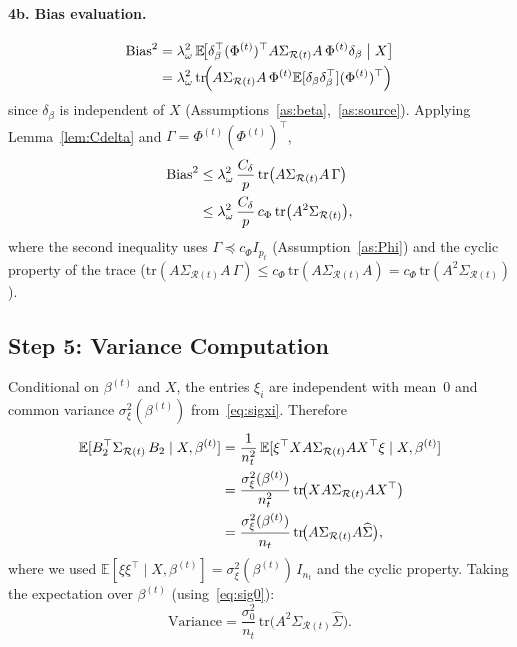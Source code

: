 \documentclass[11pt]{article}
\theoremstyle{definition}
\newcommand{\Rt}{\mathcal{R}(t)}
\newcommand{\SigR}{\Sigma_{\Rt}}
\newcommand{\hSig}{\widehat{\Sigma}}
\newcommand{\E}{\mathbb{E}}
\newcommand{\tr}{\mathrm{tr}}
\begin{document}
\paragraph{4b.  Bias evaluation.}
 
\begin{align}
  \text{Bias}^2
  &=\lambda_\omega^2\,
    \E\!\bigl[\delta_\beta^\top(\Phi^{(t)})^\top
    A\SigR A\,\Phi^{(t)}\delta_\beta
    \;\big|\;X\bigr]
  \notag\\
  &=\lambda_\omega^2\,
    \tr\!\Bigl(A\SigR A\,
    \Phi^{(t)}\E[\delta_\beta\delta_\beta^\top](\Phi^{(t)})^\top
    \Bigr)
  \label{eq:bias_trace}
\end{align}
since $\delta_\beta$ is independent of $X$
(Assumptions~\ref{as:beta},~\ref{as:source}).
Applying Lemma~\ref{lem:Cdelta} and
$\Gamma=\Phi^{(t)}(\Phi^{(t)})^\top$,
\begin{align}
  \text{Bias}^2
  &\le
  \lambda_\omega^2\,\frac{C_\delta}{p}\,
  \tr\bigl(A\SigR A\,\Gamma\bigr)
  \notag\\
  &\le
  \lambda_\omega^2\,\frac{C_\delta}{p}\,c_\Phi\,
  \tr\bigl(A^2\SigR\bigr),
  \label{eq:bias_bound}
\end{align}
where the second inequality uses
$\Gamma\preceq c_\Phi I_{p_t}$ (Assumption~\ref{as:Phi})
and the cyclic property of the trace
($\tr(A\SigR A\,\Gamma)\le c_\Phi\,\tr(A\SigR A)
=c_\Phi\,\tr(A^2\SigR)$).
 
\subsection{Step 5: Variance Computation}\label{sec:step5}
 
Conditional on $\beta^{(t)}$ and $X$, the entries $\xi_i$ are
independent with mean~$0$ and common variance
$\sigma_\xi^2(\beta^{(t)})$
from~\eqref{eq:sigxi}.  Therefore
\begin{align}
  \E[B_2^\top\SigR\,B_2\mid X,\beta^{(t)}]
  &=\frac{1}{n_t^2}\,
    \E[\xi^\top X A\SigR A X^\top\xi\mid X,\beta^{(t)}]
  \notag\\
  &=\frac{\sigma_\xi^2(\beta^{(t)})}{n_t^2}\,
    \tr\!\bigl(X A\SigR A X^\top\bigr)
  \notag\\
  &=\frac{\sigma_\xi^2(\beta^{(t)})}{n_t}\,
    \tr\!\bigl(A\SigR A\hSig\bigr),
  \label{eq:var_cond}
\end{align}
where we used $\E[\xi\xi^\top\mid X,\beta^{(t)}]
=\sigma_\xi^2(\beta^{(t)})\,I_{n_t}$ and the cyclic property.
Taking the expectation over $\beta^{(t)}$ (using~\eqref{eq:sig0}):
\begin{equation}\label{eq:var}
  \text{Variance}
  =\frac{\sigma_0^2}{n_t}\,
  \tr\!\bigl(A^2\SigR\hSig\bigr).
\end{equation}
 
\end{document}

